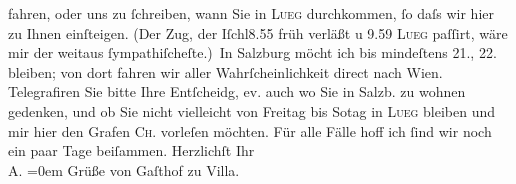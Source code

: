 \begin{ledgroupsized}[t]{13cm}
               fahren, oder uns zu ſchreiben, wann Sie in \textsc{Lueg} durchkommen, ſo daſs wir hier zu Ihnen einſteigen. (Der Zug, der Iſchl8.55 früh verläßt u 9.59{ }\textsc{Lueg} paſſirt, wäre mir der weitaus ſympathiſcheſte.) In Salzburg möcht ich bis mindeſtens 21.,
                  22. bleiben; von dort fahren wir aller Wahrſcheinlichkeit direct nach
                  Wien.\pend
           \pstart
           Telegrafiren Sie bitte Ihre Entſcheidg, ev. auch wo Sie in Salzb. zu {\pb}wohnen gedenken, und
               ob Sie nicht vielleicht von Freitag bis So{\geminationn}tag in \textsc{Lueg} bleiben und mir hier den Grafen \textsc{Ch}. vorleſen möchten.\pend
           \pstart
           Für alle Fälle hoff ich ſind wir noch ein paar Tage beiſammen.\pend
           \pstart
           Herzlichſt Ihr{\\[\baselineskip]}\spacefill\mbox{A.}\pend
           \leftskip=0em{}\pstart
           \noindent{}Grüße von Gaſthof zu Villa.\pend
           
         
         \endnumbering{}\end{ledgroupsized}  \newcommand{\dateiname}{L01444}\newcommand{\titel}{Arthur Schnitzler an Richard Beer-Hofmann, 14. 9. 1904}\newcommand{\editorInnen}{Martin Anton Müller und Gerd-Hermann Susen}
      